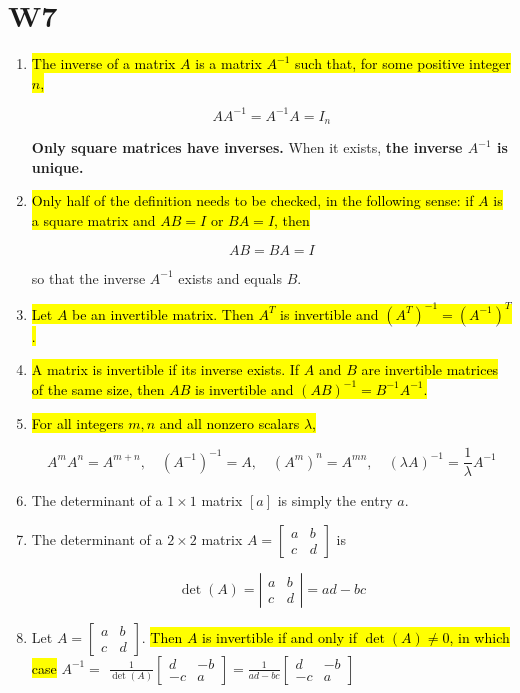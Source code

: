 \documentclass[10pt]{article}
\begin{document}
\section{W7}
\begin{enumerate}
\item \hl{The inverse of a matrix $A$ is a matrix $A^{-1}$ such that, for some positive integer $n$,}

$$
A A^{-1}=A^{-1} A=I_{n}
$$

\textbf{Only square matrices have inverses.} When it exists, \textbf{the inverse $A^{-1}$ is unique.}

\item \hl{Only half of the definition needs to be checked, in the following sense: if $A$ is a square matrix and $A B=I$ or $B A=I$, then}

$$
A B=B A=I
$$

so that the inverse $A^{-1}$ exists and equals $B$.

\item \hl{Let $A$ be an invertible matrix. Then $A^{T}$ is invertible and $\left(A^{T}\right)^{-1}=\left(A^{-1}\right)^{T}$.}

\item \hl{A matrix is invertible if its inverse exists. If $A$ and $B$ are invertible matrices of the same size, then $A B$ is invertible and $(A B)^{-1}=B^{-1} A^{-1}$.}

\item \hl{For all integers $m, n$ and all nonzero scalars $\lambda$,}

$$
A^{m} A^{n}=A^{m+n}, \quad\left(A^{-1}\right)^{-1}=A, \quad\left(A^{m}\right)^{n}=A^{m n}, \quad(\lambda A)^{-1}=\frac{1}{\lambda} A^{-1}
$$

\item The determinant of a $1 \times 1$ matrix $[a]$ is simply the entry $a$.

\item The determinant of a $2 \times 2$ matrix $A=\left[\begin{array}{ll}a & b \\ c & d\end{array}\right]$ is

$$
\operatorname{det}(A)=\left|\begin{array}{ll}
a & b \\
c & d
\end{array}\right|=a d-b c
$$

\item Let $A=\left[\begin{array}{ll}a & b \\ c & d\end{array}\right]$. \hl{Then $A$ is invertible if and only if $\operatorname{det}(A) \neq 0$, in which case} $A^{-1}=$ $\frac{1}{\operatorname{det}(A)}\left[\begin{array}{rr}d & -b \\ -c & a\end{array}\right]=\frac{1}{a d-b c}\left[\begin{array}{rr}d & -b \\ -c & a\end{array}\right]$


\end{enumerate}
\end{document}
